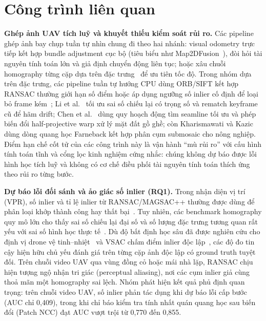 \documentclass[conference]{IEEEtran}
\begin{document}
\section{Công trình liên quan}
\textbf{Ghép ảnh UAV tích luỹ và khuyết thiếu kiểm soát rủi ro.} Các pipeline ghép
ảnh bay chụp tuần tự nhìn chung đi theo hai nhánh: visual odometry trực tiếp kết hợp
bundle adjustment cục bộ (tiêu biểu như Map2DFusion~\cite{map2dfusion}), đòi hỏi tài
nguyên tính toán lớn và giả định chuyển động liên tục; hoặc xâu chuỗi homography từng
cặp dựa trên đặc trưng~\cite{hwang2026,li2023,chen2022,dronezaic} để ưu tiên tốc độ.
Trong nhóm dựa trên đặc trưng, các pipeline tuần tự hướng CPU dùng ORB/SIFT kết hợp
RANSAC thường giới hạn số điểm hoặc áp dụng ngưỡng số inlier cố định để loại bỏ frame
kém~\cite{hwang2026}; Li et al.~\cite{li2023} tối ưu sai số chiếu lại có trọng số và
rematch keyframe cũ để hãm drift; Chen et al.~\cite{chen2022} dùng quy hoạch động tìm
seamline tối ưu và phép biến đổi half-projective warp xử lý mặt đất gồ ghề; còn
Kharismawati và Kazic~\cite{dronezaic} dùng dòng quang học Farneback kết hợp phân cụm
submosaic cho nông nghiệp. Điểm hạn chế cốt tử của các công trình này là vận hành
``mù rủi ro'' với cấu hình tính toán tĩnh và cổng lọc kinh nghiệm cứng nhắc: chúng không
dự báo được lỗi hình học tích luỹ và không có cơ chế điều phối tài nguyên tính toán
thích ứng theo rủi ro từng bước.

\textbf{Dự báo lỗi đối sánh và ảo giác số inlier (RQ1).} Trong nhận diện vị trí
(VPR), số inlier và tỉ lệ inlier từ RANSAC/MAGSAC++ thường được dùng để phân loại
khớp thành công hay thất bại~\cite{zaffar2024,sferrazza2024}. Tuy nhiên, các
benchmark homography quy mô lớn cho thấy sai số chiếu lại đại số và số lượng đặc
trưng tương quan rất yếu với sai số hình học thực tế~\cite{barath2023,yuan2024}. Dù
độ bất định học sâu đã được nghiên cứu cho định vị drone vệ tinh--nhiệt~\cite{uasthn}
và VSAC chấm điểm inlier độc lập~\cite{ivashechkin2021}, các độ đo tin cậy hiện hữu
chủ yếu đánh giá trên từng cặp ảnh độc lập có ground truth tuyệt đối. Trên chuỗi video
UAV qua vùng đồng cỏ hoặc mái nhà lặp, RANSAC chịu hiện tượng ngộ nhận tri giác
(perceptual aliasing), nơi các cụm inlier giả cùng thoả mãn một homography sai lệch.
Nhóm phát hiện kết quả phủ định quan trọng: trên chuỗi video UAV, số inlier phản tác
dụng khi dự báo lỗi cấp bước (AUC chỉ 0,409), trong khi chỉ báo kiểm tra tính nhất
quán quang học sau biến đổi (Patch NCC) đạt AUC vượt trội từ 0,770 đến 0,855.
\end{document}

